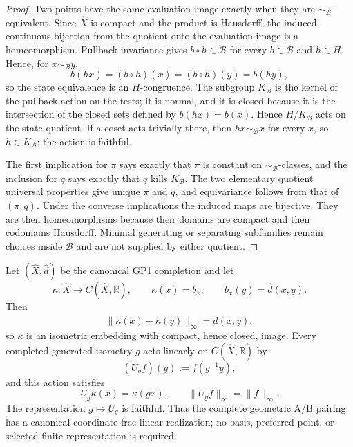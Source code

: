 \documentclass[11pt,a4paper]{article}
\begin{document}
\begin{proof}
Two points have the same evaluation image exactly when they are
\(\sim_{\mathcal B}\)-equivalent.  Since \(\widehat X\) is compact and the
product is
Hausdorff, the induced continuous bijection from the quotient onto the
evaluation image is a homeomorphism.  Pullback invariance gives
\(b\circ h\in\mathcal B\) for every \(b\in\mathcal B\) and \(h\in H\).
Hence, for \(x\sim_{\mathcal B}y\),
\[
 b(hx)=(b\circ h)(x)=(b\circ h)(y)=b(hy),
\]
so the state equivalence is an \(H\)-congruence.  The subgroup
\(K_{\mathcal B}\) is the kernel of the pullback action on the tests; it is
normal, and it is closed because it is the intersection of the closed sets
defined by \(b(hx)=b(x)\).  Hence \(H/K_{\mathcal B}\) acts on the state
quotient.  If a coset acts trivially there, then \(hx\sim_{\mathcal B}x\) for
every \(x\), so \(h\in K_{\mathcal B}\); the action is faithful.

The first implication for \(\pi\) says exactly that \(\pi\) is constant on
\(\sim_{\mathcal B}\)-classes, and the inclusion for \(q\) says exactly that
\(q\) kills \(K_{\mathcal B}\).  The two elementary quotient universal
properties give unique \(\bar\pi\) and \(\bar q\), and equivariance follows
from that of \((\pi,q)\).  Under the converse implications the induced maps
are bijective.  They are then homeomorphisms because their domains are compact
and their codomains Hausdorff.  Minimal generating or separating subfamilies
remain choices inside \(\mathcal B\) and are not supplied by either quotient.
\end{proof}

\begin{theorem}
\label{p2:thm:canonical-banach-realization}
Let \((\widehat X,\widehat d)\) be the canonical GP1 completion and let
\[
 \kappa:\widehat X\longrightarrow C(\widehat X,\mathbb R),
\qquad
\kappa(x)=b_x,
\qquad
 b_x(y)=\widehat d(x,y).
\]
Then
\[
 \lVert\kappa(x)-\kappa(y)\rVert_\infty=\widehat d(x,y),
\]
so \(\kappa\) is an isometric embedding with compact, hence closed, image.
Every completed generated isometry \(g\) acts linearly on
\(C(\widehat X,\mathbb R)\) by
\[
 (U_gf)(y):=f(g^{-1}y),
\]
and this action satisfies
\[
 U_g\kappa(x)=\kappa(gx),
 \qquad
 \lVert U_gf\rVert_\infty=\lVert f\rVert_\infty.
\]
The representation \(g\mapsto U_g\) is faithful.  Thus the complete
geometric A/B pairing has a canonical coordinate-free linear realization;
no basis, preferred point, or selected finite representation is required.
\end{theorem}
\end{document}
